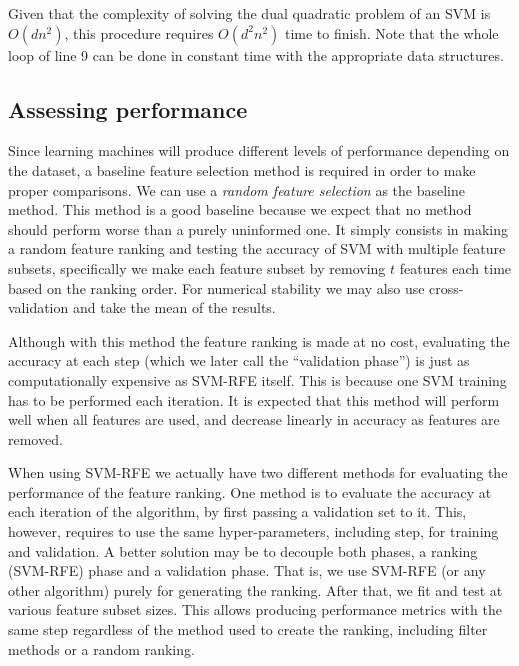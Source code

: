 Given that the complexity of solving the dual quadratic problem of an SVM is $O(dn^2)$, this procedure requires $O(d^2n^2)$ time to finish. Note that the whole loop of line 9 can be done in constant time with the appropriate data structures.

\subsection{Assessing performance}

Since learning machines will produce different levels of performance depending on the dataset, a baseline feature selection method is required in order to make proper comparisons. We can use a \emph{random feature selection} as the baseline method. This method is a good baseline because we expect that no method should perform worse than a purely uninformed one. It simply consists in making a random feature ranking and testing the accuracy of SVM with multiple feature subsets, specifically we make each feature subset by removing $t$ features each time based on the ranking order. For numerical stability we may also use cross-validation and take the mean of the results. 

Although with this method the feature ranking is made at no cost, evaluating the accuracy at each step (which we later call the “validation phase”) is just as computationally expensive as SVM-RFE itself. This is because one SVM training has to be performed each iteration. It is expected that this method will perform well when all features are used, and decrease linearly in accuracy as features are removed.

When using SVM-RFE we actually have two different methods for evaluating the performance of the feature ranking. One method is to evaluate the accuracy at each iteration of the algorithm, by first passing a validation set to it. This, however, requires to use the same hyper-parameters, including step, for training and val\-i\-da\-tion. A better solution may be to decouple both phases, a ranking (SVM-RFE) phase and a validation phase. That is, we use SVM-RFE (or any other algorithm) purely for generating the ranking. After that, we fit and test at various feature subset sizes. This allows producing performance metrics with the same step regardless of the method used to create the ranking, including filter methods or a random ranking.


